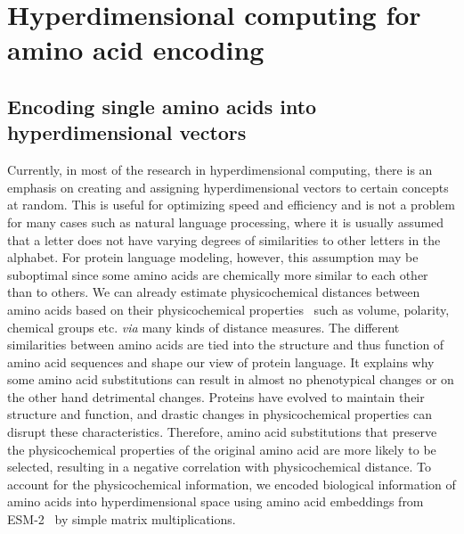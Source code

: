 \chapter{Hyperdimensional computing for amino acid encoding}
\section{Encoding single amino acids into hyperdimensional vectors}
Currently, in most of the research in hyperdimensional computing, there is an emphasis on creating and assigning hyperdimensional vectors to certain concepts at random. This is useful for optimizing speed and efficiency and is not a problem for many cases such as natural language processing, where it is usually assumed that a letter does not have varying degrees of similarities to other letters in the alphabet. For protein language modeling, however, this assumption may be suboptimal since some amino acids are chemically more similar to each other than to others. We can already estimate physicochemical distances between amino acids based on their physicochemical properties~\cite{physicochem} such as volume, polarity, chemical groups etc. \textit{via} many kinds of distance measures. The different similarities between amino acids are tied into the structure and thus function of amino acid sequences and shape our view of protein language. It explains why some amino acid substitutions can result in almost no phenotypical changes or on the other hand detrimental changes. Proteins have evolved to maintain their structure and function, and drastic changes in physicochemical properties can disrupt these characteristics. Therefore, amino acid substitutions that preserve the physicochemical properties of the original amino acid are more likely to be selected, resulting in a negative correlation with physicochemical distance. To account for the physicochemical information, we encoded biological information of amino acids into hyperdimensional space using amino acid embeddings from ESM-2~\cite{esm2} by simple matrix multiplications.

